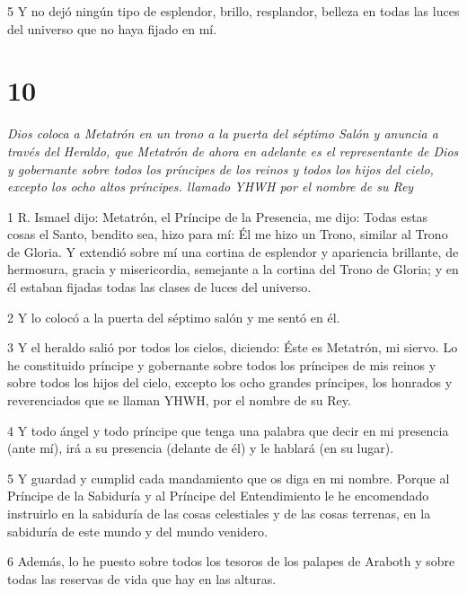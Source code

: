 \par 5 Y no dejó ningún tipo de esplendor, brillo, resplandor, belleza en todas las luces del universo que no haya fijado en mí.

\chapter{10}

\par \textit{Dios coloca a Metatrón en un trono a la puerta del séptimo Salón y anuncia a través del Heraldo, que Metatrón de ahora en adelante es el representante de Dios y gobernante sobre todos los príncipes de los reinos y todos los hijos del cielo, excepto los ocho altos príncipes. llamado YHWH por el nombre de su Rey}

\par 1 R. Ismael dijo: Metatrón, el Príncipe de la Presencia, me dijo: Todas estas cosas el Santo, bendito sea, hizo para mí: Él me hizo un Trono, similar al Trono de Gloria. Y extendió sobre mí una cortina de esplendor y apariencia brillante, de hermosura, gracia y misericordia, semejante a la cortina del Trono de Gloria; y en él estaban fijadas todas las clases de luces del universo.

\par 2 Y lo colocó a la puerta del séptimo salón y me sentó en él.

\par 3 Y el heraldo salió por todos los cielos, diciendo: Éste es Metatrón, mi siervo. Lo he constituido príncipe y gobernante sobre todos los príncipes de mis reinos y sobre todos los hijos del cielo, excepto los ocho grandes príncipes, los honrados y reverenciados que se llaman YHWH, por el nombre de su Rey.

\par 4 Y todo ángel y todo príncipe que tenga una palabra que decir en mi presencia (ante mí), irá a su presencia (delante de él) y le hablará (en su lugar).

\par 5 Y guardad y cumplid cada mandamiento que os diga en mi nombre. Porque al Príncipe de la Sabiduría y al Príncipe del Entendimiento le he encomendado instruirlo en la sabiduría de las cosas celestiales y de las cosas terrenas, en la sabiduría de este mundo y del mundo venidero.

\par 6 Además, lo he puesto sobre todos los tesoros de los palapes de Araboth y sobre todas las reservas de vida que hay en las alturas.

